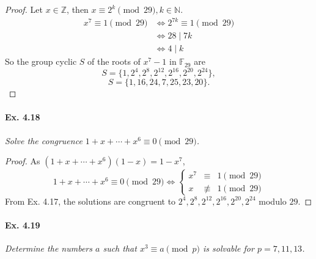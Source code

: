 \documentclass[11pt,a4paper]{article}
\newcommand{\Z}{\mathbb{Z}}
\newcommand{\N}{\mathbb{N}}
\newcommand{\F}{\mathbb{F}}
\begin{document}
\begin{proof}
Let $x \in \Z$, then $x \equiv 2^k \pmod{29} , k \in \N$.
\begin{align*}
x^7 \equiv 1 \pmod{29} &\iff 2^{7k} \equiv 1 \pmod {29}\\
&\iff 28 \mid 7k\\
&\iff 4 \mid k
\end{align*}
So the group cyclic  $S$ of the roots of $x^7 - 1$ in $\F_{29}$ are
$$S = \{1,2^4,2^8,2^{12},2^{16},2^{20},2^{24}\},$$
$$S = \{1,16,24,7,25,23,20\}.$$
\end{proof}

\paragraph{Ex. 4.18}

{\it Solve the congruence $1 + x + \cdots + x^6 \equiv 0 \pmod {29}$.
}

\begin{proof} As $(1 + x + \cdots + x^6)(1-x) = 1-x^7$,
$$1 + x + \cdots + x^6 \equiv 0 \pmod {29} \iff
\left\{
\begin{array}{ccc}
  x^7&  \equiv & 1 \pmod{29}  \\
  x &  \not \equiv &1 \pmod {29}      
\end{array}
\right.
$$
From Ex. 4.17, the solutions are congruent to $2^4,2^8,2^{12},2^{16},2^{20},2^{24}$ modulo $29$.
\end{proof}

\paragraph{Ex. 4.19}

{\it  Determine the numbers $a$ such that $x^3 \equiv a \pmod {p}$ is solvable for $p = 7, 11, 13$.
}
\end{document}
